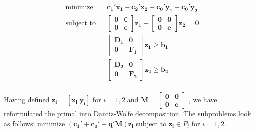 \documentclass{article}
\begin{document}
\noindent
\begin{equation*}
\begin{aligned}
& \text{minimize} && \mathbf{c_1' x_1 + c_2' x_2 + c_0' y_1 + c_0' y_2} \\
& \text{subject to} && \mathbf{\begin{bmatrix} \mathbf{0} & \mathbf{0} \\ 
\mathbf{0} & \mathbf{e}
\end{bmatrix} z_1 - \begin{bmatrix} \mathbf{0} & \mathbf{0} \\ 
\mathbf{0} & \mathbf{e}
\end{bmatrix} z_2 = 0} \\
&&&  \begin{bmatrix} \mathbf{D_1} & \mathbf{0} \\ 
\mathbf{0} & \mathbf{F_1}
\end{bmatrix} \mathbf{z_1 \geq b_1} \\
&&&  \begin{bmatrix} \mathbf{D_2} & \mathbf{0} \\ 
\mathbf{0} & \mathbf{F_2}
\end{bmatrix} \mathbf{z_2 \geq b_2} \\
\end{aligned}
\end{equation*}

\noindent
Having defined $\mathbf{z_i = [x_i \; y_i]}$ for $i = 1,2$ and $\mathbf{M = } \begin{bmatrix} \mathbf{0} & \mathbf{0} \\ 
\mathbf{0} & \mathbf{e}
\end{bmatrix}$ , we have reformulated the primal into Dantiz-Wolfe decomposition.  The subproblems look as follows:  minimize $\mathbf{(c_1' + c_0' - q'M) z_i}$ subject to $\mathbf{z_i} \in P_i$ for $i = 1,2$.    
\end{document}
